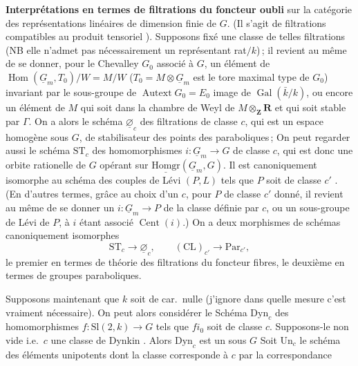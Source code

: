 \documentclass[11pt,a4paper]{article}
\begin{document}
\textbf{Interprétations en termes de filtrations du foncteur oubli} sur la
catégorie des représentations linéaires de dimension finie de $G$. (Il s'agit
de filtrations compatibles au produit tensoriel ). Supposons fixé une classe 
de  telles filtrations (NB elle
n'admet pas nécessairement un représentant rat$/k$)\,; il revient au même de
se donner, pour le Chevalley $G_0$ associé à $G$, un élément de
$\operatorname{Hom}(\underline{G}_m,T_0)/W=M/W$
($T_0=M\otimes\underline{G}_m$ est le tore maximal type de $G_0$) invariant
par le sous-groupe \add{$\Gamma$} de $\operatorname{Autext}G_0=E_0$ image de
$\operatorname{Gal}(\bar k/k)$, ou encore un élément de $M$ qui soit dans la
chambre de Weyl de $M\otimes_{\mathbf{Z}}\mathbf{R}$ et qui soit stable par
$\Gamma$. On a alors le schéma $\underline{\varnothing}_c$ des filtrations de
classe $c$, qui est un espace homogène sous $G$, de stabilisateur des points
des paraboliques\,;  On
peut regarder aussi le schéma $\mathrm{ST}_c$ des homomorphismes
$i\colon\underline{G}_m\to G$ de classe $c$, qui est donc une orbite
rationelle de $G$ opérant sur $\underline{\mathrm{Homgr}}(\underline{G}_m,G)$.
Il est canoniquement isomorphe au schéma des couples de Lévi $(P,L)$ tels que
$P$ soit de classe $c'$ . (En
d'autres termes, grâce au choix d'un $c$, pour $P$ de classe $c'$ donné, il
revient au même de se donner un $i\colon\underline{G}_m\to P$ de la classe
définie par $c$, ou un sous-groupe de Lévi de $P$, à $i$ étant associé
$\operatorname{Cent}(i)$.) On a deux morphismes de schémas canoniquement
isomorphes
\[
  \mathrm{ST}_c\to\underline{\varnothing}_c,\qquad
  (\mathrm{CL})_{c'}\to\mathrm{Par}_{c'},
\]
le premier en termes de théorie des filtrations du foncteur fibres, le
deuxième en termes de groupes paraboliques.

Supposons maintenant que $k$ soit de car.\ nulle (j'ignore dans quelle mesure
c'est vraiment nécessaire). On peut alors considérer le Schéma $\mathrm{Dyn}_c$
des homomorphismes $f\colon\mathrm{Sl}(2,k)\to G$ tels que $f i_0$ soit de
classe $c$. Supposons-le non vide  i.e.\ $c$ une
classe de Dynkin . Alors $\mathrm{Dyn}_c$ est un
  sous $G$ 
 Soit $\mathrm{Un}_c$ le schéma des éléments unipotents
 dont la classe corresponde à $c$ par la correspondance
\end{document}
